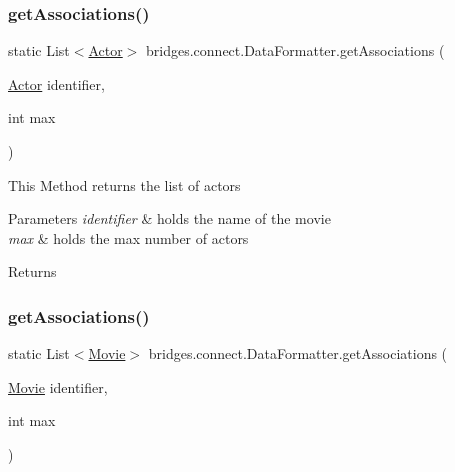 \subsubsection{\texorpdfstring{get\+Associations()}{getAssociations()}\hspace{0.1cm}{\footnotesize\ttfamily [4/5]}}
{\footnotesize\ttfamily static List$<$\hyperlink{classbridges_1_1data__src__dependent_1_1_actor}{Actor}$>$ bridges.\+connect.\+Data\+Formatter.\+get\+Associations (\begin{DoxyParamCaption}\item[{\hyperlink{classbridges_1_1data__src__dependent_1_1_actor}{Actor}}]{identifier,  }\item[{int}]{max }\end{DoxyParamCaption})\hspace{0.3cm}{\ttfamily [static]}}

This Method returns the list of actors 
\begin{DoxyParams}{Parameters}
{\em identifier} & holds the name of the movie \\
\hline
{\em max} & holds the max number of actors \\
\hline
\end{DoxyParams}
\begin{DoxyReturn}{Returns}

\end{DoxyReturn}
\mbox{\label{classbridges_1_1connect_1_1_data_formatter_ad0377b692c07836fb1016e5fb296e79c}} 
\subsubsection{\texorpdfstring{get\+Associations()}{getAssociations()}\hspace{0.1cm}{\footnotesize\ttfamily [5/5]}}
{\footnotesize\ttfamily static List$<$\hyperlink{classbridges_1_1data__src__dependent_1_1_movie}{Movie}$>$ bridges.\+connect.\+Data\+Formatter.\+get\+Associations (\begin{DoxyParamCaption}\item[{\hyperlink{classbridges_1_1data__src__dependent_1_1_movie}{Movie}}]{identifier,  }\item[{int}]{max }\end{DoxyParamCaption})\hspace{0.3cm}{\ttfamily [static]}}

